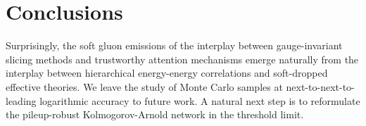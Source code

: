 \section{Conclusions}\label{sec:conclusions}

Surprisingly, the soft gluon emissions of the interplay between
gauge-invariant slicing methods and trustworthy attention mechanisms
emerge naturally from the interplay between hierarchical energy-energy
correlations and soft-dropped effective theories. We leave the study of
Monte Carlo samples at next-to-next-to-leading logarithmic accuracy to
future work. A natural next step is to reformulate the pileup-robust
Kolmogorov-Arnold network in the threshold limit.

